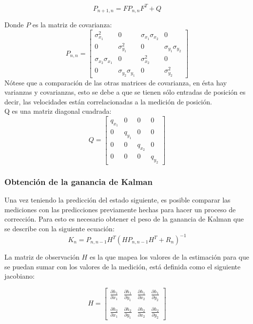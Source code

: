 \begin{equation}
P_{n+1,n} = F P_{n,n} F^T + Q
\label{eq:extrapolation_process_cov_matrix}
\end{equation}

Donde $P$ es la matriz de covarianza:
\begin{equation}
P_{n,n} =
\begin{bmatrix}
\sigma^2_{x_1} & 0 & \sigma_{x_1}\sigma_{x_2} & 0\\ 
0 & \sigma^2_{y_1} & 0 & \sigma_{y_1}\sigma_{y_2}\\ 
\sigma_{x_2}\sigma_{x_1} & 0 & \sigma^2_{x_2} & 0\\ 
0 & \sigma_{y_2}\sigma_{y_1} & 0 & \sigma^2_{y_2} 
\end{bmatrix}
\end{equation}	
Nótese que a comparación de las otras matrices de covarianza, en ésta hay varianzas y covarianzas, esto se debe a que se tienen sólo entradas de posición es decir, las velocidades están correlacionadas a la medición de posición.
\\
Q es una matriz diagonal cuadrada: 
\begin{equation}
Q =
\begin{bmatrix}
q_{x_1} & 0 & 0 & 0\\ 
0 & q_{y_1} & 0 & 0\\ 
0 & 0 & q_{x_2} & 0\\ 
0 & 0 & 0   & q_{y_2}
\end{bmatrix}
\end{equation}	


		\subsubsection*{Obtención de la ganancia de Kalman}
	Una vez teniendo la predicción del estado siguiente, es posible comparar las mediciones con las predicciones previamente hechas para hacer un proceso de corrección. Para esto es necesario obtener el peso de la ganancia de Kalman que se describe con la siguiente ecuación:
\begin{equation}
	K_n = P_{n,n-1} H^T (H P_{n,n-1} H^T + R_n)^{-1}
	\label{eq:kalman_gain}
\end{equation}

	La matriz de observación $H$ es la que mapea los valores de la estimación para que se puedan sumar con los valores de la medición, está definida como el siguiente jacobiano:

\begin{equation}
	H =
	\begin{bmatrix}
	\frac{\partial h_1}{\partial x_1} & \frac{\partial h_1}{\partial y_1} & \frac{\partial h_1}{\partial x_2} & \frac{\partial h_1}{\partial y_2}\\
	\\
	\frac{\partial h_2}{\partial x_1} & \frac{\partial h_2}{\partial y_1} & \frac{\partial h_2}{\partial x_2} & \frac{\partial h_2}{\partial y_2}
	\end{bmatrix}
\end{equation}

